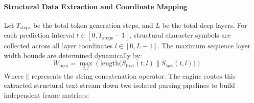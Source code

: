 \documentclass[10pt,conference]{IEEEtran}
\begin{document}
\paragraph{Structural Data Extraction and Coordinate Mapping}
Let $T_{\text{steps}}$ be the total token generation steps, and $L$ be the total deep layers. For each prediction interval $t \in [0, T_{\text{steps}}-1]$, structural character symbols are collected across all layer coordinates $l \in [0, L-1]$. The maximum sequence layer width bounds are determined dynamically by:
\[
W_{\text{max}} = \max_{t, l} \left( \text{length}\Big(S_{\text{first}}(t, l) \mathbin{\parallel} S_{\text{last}}(t, l)\Big) \right)
\]
Where $\mathbin{\parallel}$ represents the string concatenation operator. The engine routes this extracted structural text stream down two isolated parsing pipelines to build independent frame matrices:
\end{document}
